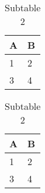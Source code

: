 \begin{table}[h]
    \caption{Table}
    \label{tab: table}
    \begin{subtable}[h]{0.45\textwidth}
        \centering
        \caption{Subtable 1}
        \label{tab: subtable 1}
        \begin{tabular}{l l}
        A & B \tabularnewline
        \toprule
        1 & 2\\
        3 & 4\\
       \end{tabular}
    \end{subtable}
    \hfill
    \begin{subtable}[h]{0.45\textwidth}
        \centering
        \caption{Subtable 2}
        \label{tab: subtable 2}
        \begin{tabular}{l l}
        A & B \tabularnewline
        \toprule
        1 & 2\\
        3 & 4\\
       \end{tabular}
    \end{subtable}
\end{table}